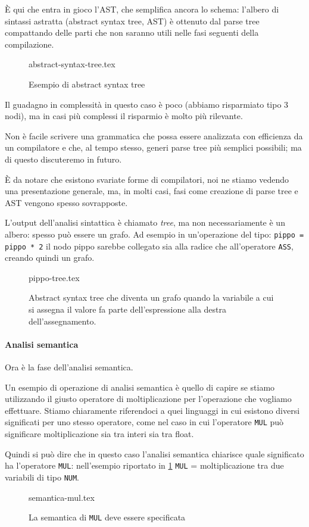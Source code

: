 \documentclass[class=book, crop=false, oneside, 12pt]{standalone}
\begin{document}
È qui che entra in gioco l’AST, che semplifica ancora lo schema: l’albero di sintassi astratta (abstract syntax tree, AST) è ottenuto dal parse tree compattando delle parti che non saranno utili nelle fasi seguenti della compilazione.
\begin{figure}[H]
	\centering
	{abstract-syntax-tree.tex}
	\caption{Esempio di abstract syntax tree}
	\label{esempio_AST}
\end{figure}
Il guadagno in complessità in questo caso è poco (abbiamo risparmiato tipo 3 nodi), ma in casi più complessi il risparmio è molto più rilevante.

Non è facile scrivere una grammatica che possa essere analizzata con efficienza da un compilatore e che, al tempo stesso, generi parse tree più semplici possibili; ma di questo discuteremo in futuro.

È da notare che esistono svariate forme di compilatori, noi ne stiamo vedendo una presentazione generale, ma, in molti casi, fasi come creazione di parse tree e AST vengono spesso sovrapposte.

L’output dell’analisi sintattica è chiamato \emph{tree}, ma non necessariamente è un albero: spesso può essere un grafo. Ad esempio in un’operazione del tipo:
\texttt{pippo = pippo * 2}
il nodo pippo sarebbe collegato sia alla radice che all’operatore \texttt{ASS}, creando quindi un grafo.
\begin{figure}[H]
	\centering
	{pippo-tree.tex}
	\caption{Abstract syntax tree che diventa un grafo quando la variabile a cui si assegna il valore fa parte dell'espressione alla destra dell'assegnamento.}
	\label{esempio_pippo}
\end{figure}

\paragraph{Analisi semantica}
Ora è la fase dell’analisi semantica.

Un esempio di operazione di analisi semantica è quello di capire se stiamo utilizzando il giusto operatore di moltiplicazione per l’operazione che vogliamo effettuare. Stiamo chiaramente riferendoci a quei linguaggi in cui esistono diversi significati per uno stesso operatore, come nel caso in cui l'operatore \texttt{MUL} può significare moltiplicazione sia tra interi sia tra float.

Quindi si può dire che in questo caso l’analisi semantica chiarisce quale significato ha l’operatore \texttt{MUL}: nell’esempio riportato in \ref{esempio_AST} \texttt{MUL} = moltiplicazione tra due variabili di tipo \texttt{NUM}.
\begin{figure}[H]
	\centering
	{semantica-mul.tex}
	\caption{La semantica di \texttt{MUL} deve essere specificata}
\end{figure}
\end{document}
